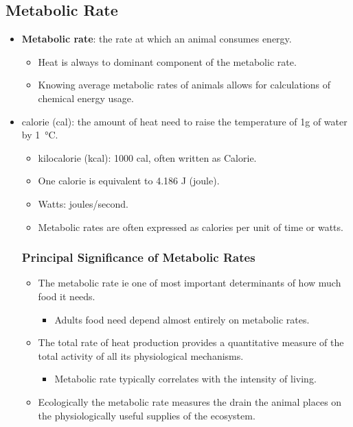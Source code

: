 \documentclass[12pt,a4paper]{article}
\begin{document}
\subsection{Metabolic Rate}
\begin{itemize}
    \item \textbf{Metabolic rate}: the rate at which an animal consumes energy.
        \begin{itemize}
            \item Heat is always to dominant component of the metabolic rate.
            \item Knowing average metabolic rates of animals allows for calculations of chemical energy usage.
        \end{itemize}
    \item calorie (cal): the amount of heat need to raise the temperature of 1g of water by \SI{1}{\celsius}. 
        \begin{itemize}
            \item kilocalorie (kcal): 1000 cal, often written as Calorie. 
            \item One calorie is equivalent to 4.186 J (joule). 
            \item Watts: joules/second.
            \item Metabolic rates are often expressed as calories per unit of time or watts.
        \end{itemize}
    \subsubsection{Principal Significance of Metabolic Rates}
    \begin{itemize}
        \item The metabolic rate ie one of most important determinants of how much food it needs.
            \begin{itemize}
                \item Adults food need depend almost entirely on metabolic rates.
            \end{itemize}
        \item The total rate of heat production provides a quantitative measure of the total activity of all its physiological mechanisms.
            \begin{itemize}
                \item Metabolic rate typically correlates with the intensity of living.
            \end{itemize}
        \item Ecologically the metabolic rate measures the drain the animal places on the physiologically useful supplies of the ecosystem.
    \end{itemize}

\end{itemize}
\end{document}
